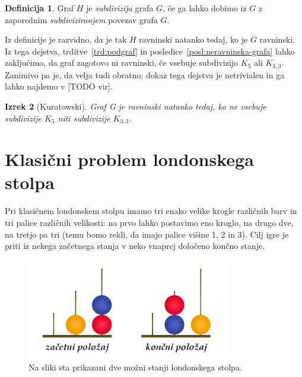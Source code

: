 \documentclass[12pt,a4paper]{amsart}
\theoremstyle{definition} %
\newtheorem{definicija}{Definicija}[section]
\theoremstyle{plain} %
\newtheorem{izrek}[definicija]{Izrek}
\newcommand{\N}{\mathbb N}
\newcommand{\graf}[1][G]{\ensuremath{#1 = (V(#1), E(#1))}}
\newcommand{\vozlisca}[1][G]{\ensuremath{V(#1)}}
\newcommand{\povezave}[1][G]{\ensuremath{E(#1)}}
\begin{document}
\begin{definicija}
    Graf $H$ je \emph{subdivizija} grafa $G$, če ga lahko dobimo iz $G$ z zaporednim \emph{subdiviziranjem} povezav grafa $G$.\cite[str.~66]{bib:potocnik}
\end{definicija}

Iz definicije je razvidno, da je tak $H$ ravninski natanko tedaj, ko je $G$ ravninski. Iz tega dejstva, trditve~\ref{trd:podgraf} in posledice~\ref{posl:neravninska-grafa} lahko zaključimo, da graf zagotovo ni ravninski, če vsebuje subdivizijo $K_5$ ali $K_{3,3}$. Zanimivo pa je, da velja tudi obratno; dokaz tega dejstva je netrivialen in ga lahko najdemo v [TODO vir].

\begin{izrek}[Kuratowski]
    \label{izr:kuratowski}
    Graf G je ravninski natanko tedaj, ko ne vsebuje subdivizije $K_5$ niti subdivizije $K_{3,3}$.
\end{izrek}

\section{Klasični problem londonskega stolpa}
Pri klasičnem londonskem stolpu imamo tri enako velike krogle različnih barv in tri palice različnih velikosti: na prvo lahko postavimo eno kroglo, na drugo dve, na tretjo pa tri (temu bomo rekli, da imajo palice višine 1, 2 in 3). Cilj igre je priti iz nekega začetnega stanja v neko vnaprej določeno končno stanje.

\begin{figure}[h]
    \includegraphics[width=250pt]{img/london-tower.png}
    \caption{Na sliki sta prikazani dve možni stanji londonskega stolpa.}
    \label{fig:stanji}
\end{figure}
\end{document}
